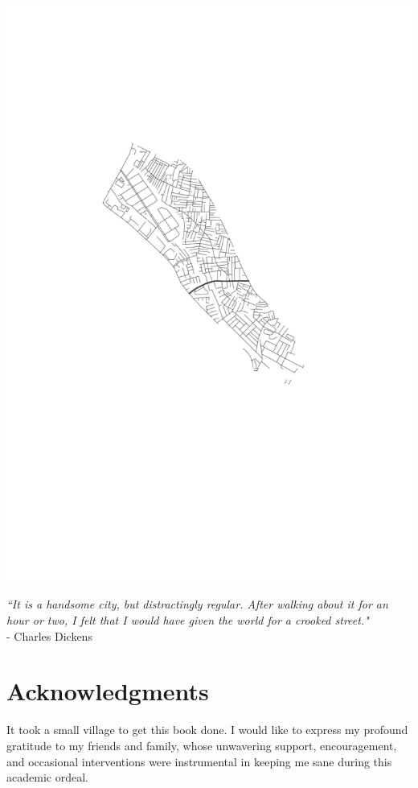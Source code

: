 \thispagestyle{empty}

\begin{center}
\includegraphics{maps/ejipura.pdf}

 \textit{``It is a handsome city, but distractingly regular. After walking about it for an hour or two, I felt that I would have given the world for a crooked street."} \\ \vspace{5pt}
    \small - Charles Dickens
\end{center}

\newpage
\section*{Acknowledgments}
It took a small village to get this book done. I would like to express my profound gratitude to my friends and family, whose unwavering support, encouragement, and occasional interventions were instrumental in keeping me sane during this academic ordeal.

